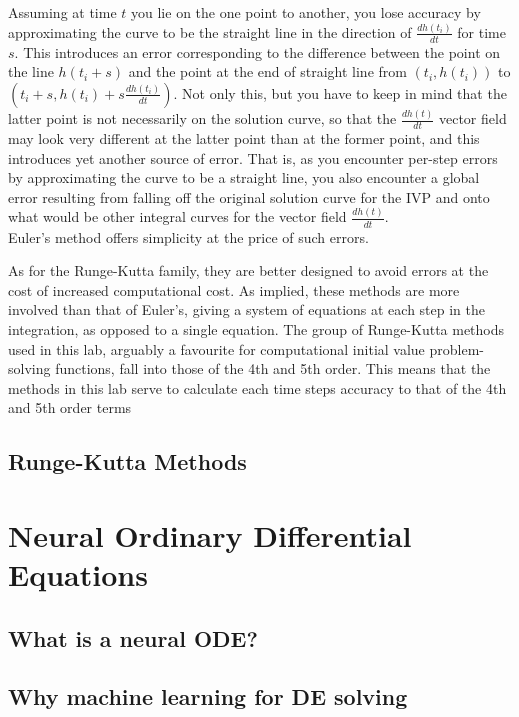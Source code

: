 \documentclass[11pt]{article}
\begin{document}
    Assuming at time $t$ you lie on the one point to another, you lose accuracy by approximating the curve to be the straight line in the direction of $\frac{dh(t_i)}{dt}$ for time $s$.
    This introduces an error corresponding to the difference between the point on the line $h(t_i+s)$ and the point at the end of straight line from $(t_i, h(t_i))$ to $(t_i + s, h(t_i) + s\frac{dh(t_i)}{dt})$.
    Not only this, but you have to keep in mind that the latter point is not necessarily on the solution curve, so that the $\frac{dh(t)}{dt}$ vector field may look very different at the latter point than at the former point, and this introduces yet another source of error.
    That is, as you encounter per-step errors by approximating the curve to be a straight line, you also encounter a global error resulting from falling off the original solution curve for the IVP and onto what would be other integral curves for the vector field $\frac{dh(t)}{dt}$.\\
    Euler's method offers simplicity at the price of such errors.

    As for the Runge-Kutta family, they are better designed to avoid errors at the cost of increased computational cost.
    As implied, these methods are more involved than that of Euler's, giving a system of equations at each step in the integration, as opposed to a single equation.
    The group of Runge-Kutta methods used in this lab, arguably a favourite for computational initial value problem-solving functions, fall into those of the 4th and 5th order.
    This means that the methods in this lab serve to calculate each time steps accuracy to that of the 4th and 5th order terms


\subsection{Runge-Kutta Methods}

\section{Neural Ordinary Differential Equations}

\subsection{What is a neural ODE?}

\subsection{Why machine learning for DE solving}
\end{document}
